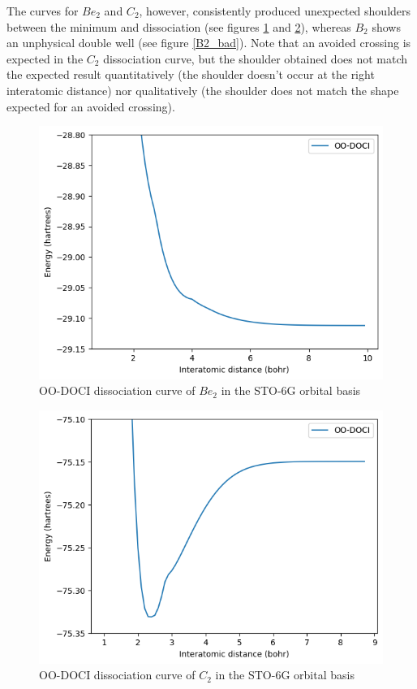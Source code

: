 \documentclass[twoside,twocolumn,9pt]{article}
\begin{document}

The curves for $Be_2$ and $C_2$, however, consistently produced unexpected shoulders between the minimum and dissociation (see figures \ref{Be2_bad} and \ref{C2_bad}), whereas $B_2$ shows an unphysical double well (see figure \ref{B2_bad}). Note that an avoided crossing is expected in the $C_2$ dissociation curve, but the shoulder obtained does not match the expected result quantitatively (the shoulder doesn't occur at the right interatomic distance) nor qualitatively (the shoulder does not match the shape expected for an avoided crossing).

\begin{figure}[h]
  \includegraphics[width=\linewidth]{Be2.png}
  \caption{OO-DOCI dissociation curve of $Be_2$ in the STO-6G orbital basis}\label{Be2_bad}
\end{figure}

\begin{figure}[h]
  \includegraphics[width=\linewidth]{C2.png}
  \caption{OO-DOCI dissociation curve of $C_2$ in the STO-6G orbital basis}\label{C2_bad}
\end{figure}
\end{document}
